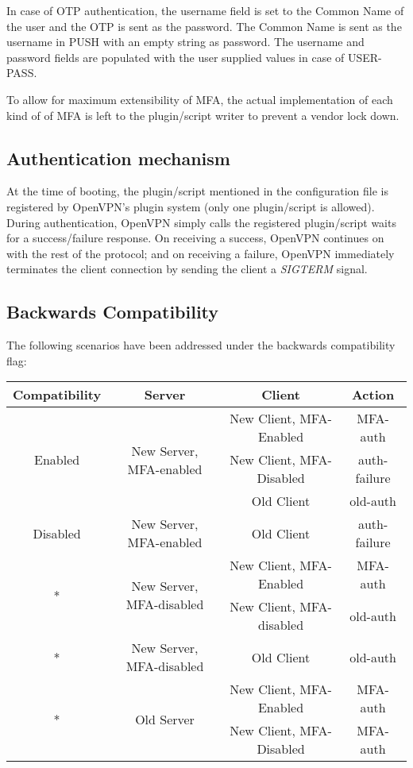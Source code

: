 \documentclass[11pt,oneside]{book}
\begin{document}
In case of OTP authentication, the username field is set to the Common Name of the user and the OTP
is sent as the password. The Common Name is sent as the username in PUSH with an empty string as
password. The username and password fields are populated with the user supplied values in case of
USER-PASS.

To allow for maximum extensibility of MFA, the actual implementation of each kind of of MFA
is left to the plugin/script writer to prevent a vendor lock down.

\subsection{Authentication mechanism}
\label{MFA:Mechanism}
At the time of booting, the plugin/script mentioned in the configuration file is registered
by OpenVPN's plugin system (only one plugin/script is allowed). During authentication, OpenVPN
simply calls the registered plugin/script waits for a success/failure response. On receiving a
success, OpenVPN continues on with the rest of the protocol; and on receiving a failure, OpenVPN
immediately terminates the client connection by sending the client a \emph{SIGTERM} signal.

\subsection{Backwards Compatibility}
The following scenarios have been addressed under the backwards compatibility flag:\\

{
    \centering
    \begin{tabular}{|c|c|c|c|}
        \hline
        \textbf{Compatibility} & \textbf{Server} & \textbf{Client} & \textbf{Action} \\

        \hline
        \multirow{3}{*}{Enabled} & \multirow{3}{*}{New Server, MFA-enabled} & New Client, MFA-Enabled & MFA-auth\\
                                 & & New Client, MFA-Disabled & auth-failure\\
                                 & & Old Client & old-auth\\
        \hline
        Disabled & New Server, MFA-enabled & Old Client & auth-failure\\

        \hline
        \multirow{2}{*}{*} & \multirow{2}{*}{New Server, MFA-disabled} & New Client, MFA-Enabled & MFA-auth\\
                           & & New Client, MFA-disabled & old-auth\\
        \hline
        * & New Server, MFA-disabled & Old Client & old-auth\\
        \hline
        \multirow{2}{*}{*} & \multirow{2}{*}{Old Server} & New Client, MFA-Enabled & MFA-auth\\
                           & & New Client, MFA-Disabled & MFA-auth\\
        \hline
    \end{tabular}
}
\end{document}
